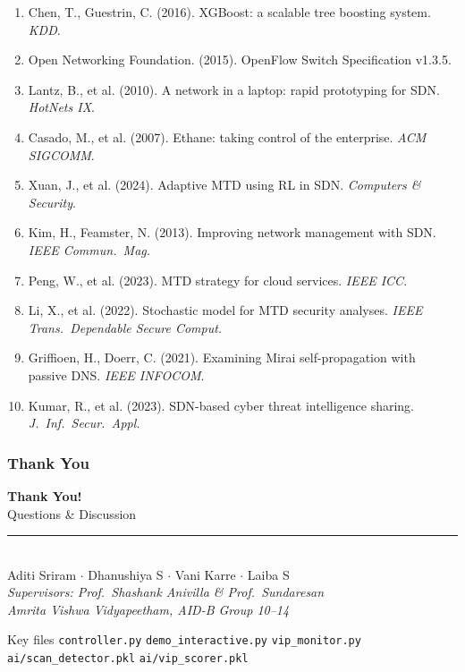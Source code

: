 \documentclass{beamer}
\begin{document}
\begin{frame}[allowframebreaks]
\begin{enumerate}
  \item Chen, T., Guestrin, C. (2016). XGBoost: a scalable tree boosting system. \textit{KDD}.
  \item Open Networking Foundation. (2015). OpenFlow Switch Specification v1.3.5.
  \item Lantz, B., et al. (2010). A network in a laptop: rapid prototyping for SDN. \textit{HotNets IX}.
  \item Casado, M., et al. (2007). Ethane: taking control of the enterprise. \textit{ACM SIGCOMM}.
  \item Xuan, J., et al. (2024). Adaptive MTD using RL in SDN. \textit{Computers \& Security}.
  \item Kim, H., Feamster, N. (2013). Improving network management with SDN. \textit{IEEE Commun.\ Mag.}
  \item Peng, W., et al. (2023). MTD strategy for cloud services. \textit{IEEE ICC}.
  \item Li, X., et al. (2022). Stochastic model for MTD security analyses. \textit{IEEE Trans.\ Dependable Secure Comput.}
  \item Griffioen, H., Doerr, C. (2021). Examining Mirai self-propagation with passive DNS. \textit{IEEE INFOCOM}.
  \item Kumar, R., et al. (2023). SDN-based cyber threat intelligence sharing. \textit{J.\ Inf.\ Secur.\ Appl.}
\end{enumerate}
\end{frame}

\begin{frame}
\frametitle{Thank You}

\begin{center}
\vspace{0.3cm}
{\Huge \textbf{Thank You!}}\\[10pt]
{\Large Questions \& Discussion}\\[16pt]
\rule{0.5\textwidth}{0.4pt}\\[8pt]

{\normalsize
Aditi Sriram $\cdot$ Dhanushiya S $\cdot$ Vani Karre $\cdot$ Laiba S\\[4pt]
\textit{Supervisors: Prof.\ Shashank Anivilla \& Prof.\ Sundaresan}\\[4pt]
\textit{Amrita Vishwa Vidyapeetham, AID-B Group 10--14}
}\\[14pt]

\begin{block}{\centering Key files}
\centering
\texttt{controller.py} \quad \texttt{demo\_interactive.py} \quad \texttt{vip\_monitor.py}\\
\texttt{ai/scan\_detector.pkl} \quad \texttt{ai/vip\_scorer.pkl}
\end{block}
\end{center}

\end{frame}
\end{document}
